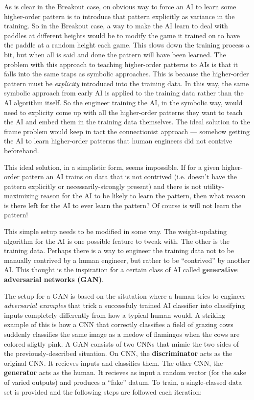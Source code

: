 \documentclass{article}
\renewcommand{\bf}{\textbf}
\renewcommand{\it}{\textit}
\begin{document}
As is clear in the Breakout case, on obvious way to force an AI to learn some higher-order pattern is to introduce that pattern explicitly as variance in the training.
So in the Breakout case, a way to make the AI learn to deal with paddles at different heights would be to modify the game it trained on to have the paddle at a random height each game. This slows down the training process a bit, but when all is said and done the pattern will have been learned.
The problem with this approach to teaching higher-order patterns to AIs is that it falls into the same traps as symbolic approaches.
This is because the higher-order pattern must be \it{explicity} introduced into the training data.
In this way, the same symbolic approach from early AI is applied to the training data rather than the AI algorithm itself.
So the engineer training the AI, in the symbolic way, would need to explicity come up with all the higher-order patterns they want to teach the AI and embed them in the training data themselves.
The ideal solution to the frame problem would keep in tact the connectionist approach --- somehow getting the AI to learn higher-order patterns that human engineers did not contrive beforehand.

This ideal solution, in a simplistic form, seems impossible.
If for a given higher-order pattern an AI trains on data that is not contrived (i.e. doesn't have the pattern explicitly or necessarily-strongly present) and there is not utility-maximizing reason for the AI to be likely to learn the pattern, then what reason is there left for the AI to ever learn the pattern? Of course is will not learn the pattern!

This simple setup needs to be modified in some way.
The weight-updating algorithm for the AI is one possible feature to tweak with.
The other is the training data.
Perhaps there is a way to engineer the training data not to be manually contrived by a human engineer, but rather to be ``contrived'' by another AI.
This thought is the inspiration for a certain class of AI called \textbf{generative adversarial networks (GAN)}.

The setup for a GAN is based on the situtation where a human tries to engineer \it{adversarial examples} that trick a successfuly trained AI classifier into classifying inputs completely differently from how a typical human would.
A striking example of this is how a CNN that correctly classifies a field of grazing cows suddenly classifies the same image as a medow of flamingos when the cows are colored sligtly pink.
A GAN consists of two CNNs that mimic the two sides of the previously-described situation.
On CNN, the \bf{discriminator} acts as the original CNN. It recieves inputs and classifies them.
The other CNN, the \bf{generator} acts as the human. It recieves as input a random vector (for the sake of varied outputs) and produces a ``fake'' datum.
To train, a single-classed data set is provided and the following steps are followed each iteration:
\end{document}
